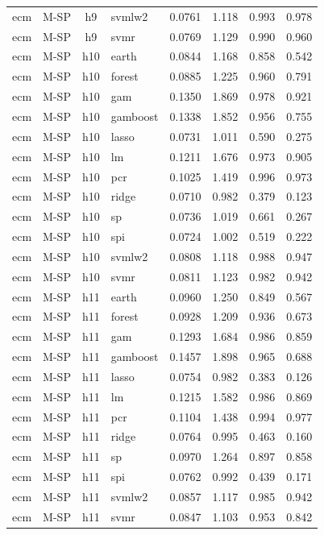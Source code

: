 \begin{ThreePartTable}
\begin{longtable}[t]{llclcccc}
ecm & M-SP & h9 & svmlw2 & 0.0761 & 1.118 & 0.993 & 0.978\\
ecm & M-SP & h9 & svmr & 0.0769 & 1.129 & 0.990 & 0.960\\
\addlinespace
ecm & M-SP & h10 & earth & 0.0844 & 1.168 & 0.858 & 0.542\\
ecm & M-SP & h10 & forest & 0.0885 & 1.225 & 0.960 & 0.791\\
ecm & M-SP & h10 & gam & 0.1350 & 1.869 & 0.978 & 0.921\\
ecm & M-SP & h10 & gamboost & 0.1338 & 1.852 & 0.956 & 0.755\\
ecm & M-SP & h10 & lasso & 0.0731 & 1.011 & 0.590 & 0.275\\
ecm & M-SP & h10 & lm & 0.1211 & 1.676 & 0.973 & 0.905\\
ecm & M-SP & h10 & pcr & 0.1025 & 1.419 & 0.996 & 0.973\\
ecm & M-SP & h10 & ridge & 0.0710 & 0.982 & 0.379 & 0.123\\
ecm & M-SP & h10 & sp & 0.0736 & 1.019 & 0.661 & 0.267\\
ecm & M-SP & h10 & spi & 0.0724 & 1.002 & 0.519 & 0.222\\
ecm & M-SP & h10 & svmlw2 & 0.0808 & 1.118 & 0.988 & 0.947\\
ecm & M-SP & h10 & svmr & 0.0811 & 1.123 & 0.982 & 0.942\\
\addlinespace
ecm & M-SP & h11 & earth & 0.0960 & 1.250 & 0.849 & 0.567\\
ecm & M-SP & h11 & forest & 0.0928 & 1.209 & 0.936 & 0.673\\
ecm & M-SP & h11 & gam & 0.1293 & 1.684 & 0.986 & 0.859\\
ecm & M-SP & h11 & gamboost & 0.1457 & 1.898 & 0.965 & 0.688\\
ecm & M-SP & h11 & lasso & 0.0754 & 0.982 & 0.383 & 0.126\\
ecm & M-SP & h11 & lm & 0.1215 & 1.582 & 0.986 & 0.869\\
ecm & M-SP & h11 & pcr & 0.1104 & 1.438 & 0.994 & 0.977\\
ecm & M-SP & h11 & ridge & 0.0764 & 0.995 & 0.463 & 0.160\\
ecm & M-SP & h11 & sp & 0.0970 & 1.264 & 0.897 & 0.858\\
ecm & M-SP & h11 & spi & 0.0762 & 0.992 & 0.439 & 0.171\\
ecm & M-SP & h11 & svmlw2 & 0.0857 & 1.117 & 0.985 & 0.942\\
ecm & M-SP & h11 & svmr & 0.0847 & 1.103 & 0.953 & 0.842\\

\end{longtable}
\end{ThreePartTable}
